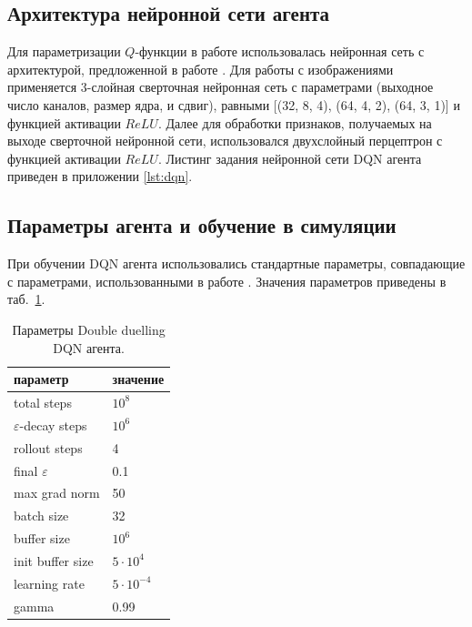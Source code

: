 \subsection{Архитектура нейронной сети агента}

Для параметризации $Q$-функции в работе использовалась нейронная сеть с архитектурой, предложенной в работе \cite{mnih2013atari}. Для работы с изображениями применяется 3-слойная сверточная нейронная сеть с параметрами (выходное число каналов, размер ядра, и сдвиг), равными [(32, 8, 4), (64, 4, 2), (64, 3, 1)] и функцией активации $ReLU$. Далее для обработки признаков, получаемых на выходе сверточной нейронной сети, использовался двухслойный перцептрон с функцией активации $ReLU$. Листинг задания нейронной сети DQN агента приведен в приложении \ref{lst:dqn}. 

\subsection{Параметры агента и обучение в симуляции}

При обучении DQN агента использовались стандартные параметры, совпадающие с параметрами, использованными в работе \cite{mnih2013atari}. Значения параметров приведены в таб.~\ref{tab:dqn_params}.

\begin{table} [htbp]
    \centering
    \begin{threeparttable}%
        \caption{Параметры Double duelling DQN агента.}\label{tab:dqn_params}%
        \begin{tabular}{| p{5cm} || p{5cm} |}
            \hline
            \hline
            параметр & значение \\
            \hline
            total steps & $10^8$ \\
            $\varepsilon$-decay steps & $10^6$ \\
            rollout steps & 4 \\
            final $\varepsilon$ & 0.1 \\
            max grad norm & 50 \\
            batch size & 32 \\
            buffer size & $10^6$ \\
            init buffer size & $5 \cdot 10^4$ \\
            learning rate & $5 \cdot 10^{-4}$ \\
            gamma & 0.99 \\
            \hline
            \hline
        \end{tabular}
    \end{threeparttable}
\end{table}

